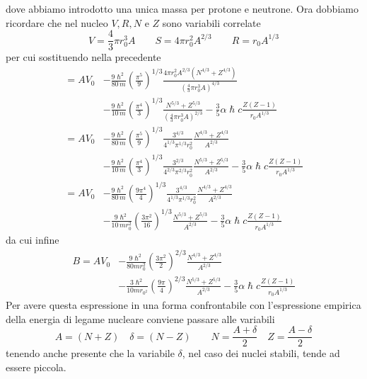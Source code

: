 dove abbiamo introdotto una unica massa per protone e neutrone.
Ora dobbiamo ricordare che nel nucleo $V, R, N$ e $Z$ sono variabili correlate
\[
V = \frac{4}{3} \pi r_{0}^{3}A \qquad S = 4\pi r_{0}^{2}A^{2/3} \qquad R = r_{0}A^{1/3}
\]
per cui sostituendo nella precedente
\begin{align*}
	= AV_{0} &- \frac{9 \hslash^{2}}{80 \, m} \left( \frac{\pi^{5}}{9} \right)^{1/3} \frac{4 \pi r_{0}^{2}A^{2/3}(N^{4/3}+Z^{4/3})}{\left( \frac{4}{3} \pi r_{0}^{3} A\right)^{4/3}} \\
	&- \frac{9 \hslash^{2}}{10 \, m} \left( \frac{\pi^{4}}{3} \right)^{1/3} \frac{N^{5/3}+Z^{5/3}}{\left( \frac{4}{3} \pi r_{0}^{3} A\right)^{2/3}} - \frac{3}{5} \alpha \hslash c \frac{Z(Z-1)}{r_{0}A^{1/3}} \\
	= AV_{0} &- \frac{9 \hslash^{2}}{80 \, m} \left( \frac{\pi^{5}}{9} \right)^{1/3} \frac{3^{4/3}}{ 4^{1/3}\pi^{1/3}r_{0}^{2}} \frac{N^{4/3}+Z^{4/3}}{A^{2/3}} \\
	&- \frac{9 \hslash^{2}}{10 \, m} \left( \frac{\pi^{4}}{3} \right)^{1/3} \frac{3^{2/3}}{ 4^{2/3}\pi^{2/3}r_{0}^{2}}\frac{N^{5/3}+Z^{5/3}}{ A^{2/3}} - \frac{3}{5} \alpha \hslash c \frac{Z(Z-1)}{r_{0}A^{1/3}} \\
	= AV_{0} &- \frac{9 \hslash^{2}}{80 \, m} \left( \frac{9\pi^{4}}{4} \right)^{1/3} \frac{3^{4/3}}{ 4^{1/3}\pi^{1/3}r_{0}^{2}} \frac{N^{4/3}+Z^{4/3}}{A^{2/3}} \\
	&- \frac{9 \hslash^{2}}{10 \, mr_{0}^{2}} \left( \frac{3\pi^{2}}{16} \right)^{1/3} \frac{N^{5/3}+Z^{5/3}}{ A^{2/3}} - \frac{3}{5} \alpha \hslash c \frac{Z(Z-1)}{r_{0}A^{1/3}}
\end{align*}
da cui infine
\begin{align}
	B = A V_{0} &- \frac{9\hslash^{2}}{80 mr_{0}^{2}} \left( \frac{3\pi^{2}}{2} \right)^{2/3}\frac{N^{4/3}+Z^{4/3}}{A^{2/3}} \nonumber\\
	&- \frac{3\hslash^{2}}{10 mr_{0^{2}}}\left( \frac{9\pi}{4} \right)^{2/3} \frac{N^{5/3}+Z^{5/3}}{A^{2/3}} - \frac{3}{5} \alpha \hslash c \frac{Z(Z-1)}{r_{0}A^{1/3}}
	\label{eq:intermediate-calc-binding-energy-fermi-gas}
\end{align}
Per avere questa espressione in una forma confrontabile con l’espressione empirica della energia di legame nucleare conviene passare alle variabili
\[
A=(N+Z) \quad\delta = (N-Z) \qquad N = \frac{A+\delta}{2} \quad Z = \frac{A- \delta}{2}
\]
tenendo anche presente che la variabile $\delta$, nel caso dei nuclei stabili, tende ad essere piccola.

